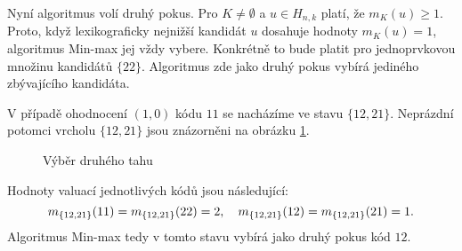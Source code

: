 Nyní algoritmus volí druhý pokus. Pro $K \neq \emptyset$ a $u \in H_{n,k}$ platí, že $m_K(u) \geq 1$. Proto, když lexikograficky nejnižší kandidát $u$ dosahuje hodnoty $m_K(u) = 1$, algoritmus Min-max jej vždy vybere. Konkrétně to bude platit pro jednoprvkovou množinu kandidátů $\{22\}$. Algoritmus zde jako druhý pokus vybírá jediného zbývajícího kandidáta. 

V případě ohodnocení $(1,0)$ kódu $11$ se nacházíme ve stavu $\{12,21\}$. Neprázdní potomci vrcholu $\{12,21\}$ jsou znázorněni na obrázku \ref{fig22druhytah}. 
\begin{figure}[h!]
    \centering
    \caption{Výběr druhého tahu}
\label{fig22druhytah}
\end{figure}
Hodnoty valuací jednotlivých kódů jsou následující:
\[m_{\{12,21\}} (11) = m_{\{12,21\}} (22) = 2, \hspace{10px} m_{\{12,21\}} (12) = m_{\{12,21\}} (21) = 1.\]
Algoritmus Min-max tedy v tomto stavu vybírá jako druhý pokus kód $12$. 

